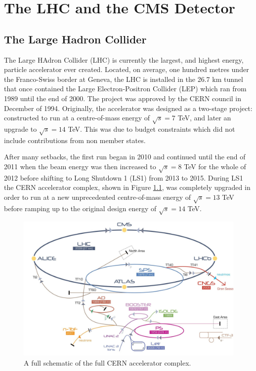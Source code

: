 \chapter{The LHC and the CMS Detector} \label{chap-detector}

\section{The Large Hadron Collider} \label{sec-TheLargeHadronCollider}

The Large HAdron Collider (LHC) is currently the largest, and highest energy, particle accelerator ever created. Located, on average, one hundred metres under the Franco-Swiss border at Geneva, the LHC is installed in the 26.7 km tunnel that once contained the Large Electron-Positron Collider (LEP) which ran from 1989 until the end of 2000. The project was approved by the CERN council in December of 1994. Originally, the accelerator was designed as a two-stage project: constructed to run at a centre-of-mass energy of $\sqrt{s}=7$ TeV, and later an upgrade to $\sqrt{s}=14$ TeV. This was due to budget constraints which did not include contributions from non member states. 

After many setbacks, the first run began in 2010 and continued until the end of 2011 when the beam energy was then increased to $\sqrt{s}=8$ TeV for the whole of 2012 before shifting to Long Shutdown 1 (LS1) from 2013 to 2015. During LS1 the CERN accelerator complex, shown in Figure \ref{fig-CERNAcceleratorComplex}, was completely upgraded in order to run at a new unprecedented centre-of-mass energy of $\sqrt{s}=13$ TeV before ramping up to the original design energy of $\sqrt{s}=14$ TeV. 

\begin{figure}\label{fig-CERNAcceleratorComplex}
\includegraphics[width=\textwidth]{Figures/CERNAcceleratorComplex.jpg}
\caption{A full schematic of the full CERN accelerator complex.}
\end{figure}

